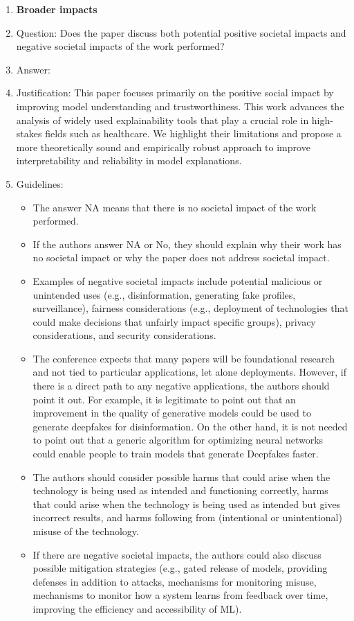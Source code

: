\documentclass{article}
\theoremstyle{plain}
\theoremstyle{definition}
\theoremstyle{remark}
\begin{document}
\begin{enumerate}
\item {\bf Broader impacts}
    \item[] Question: Does the paper discuss both potential positive societal impacts and negative societal impacts of the work performed?
    \item[] Answer: \answerYes{} %
    \item[] Justification: This paper focuses primarily on the positive social impact by improving model understanding and trustworthiness. This work advances the analysis of widely used explainability tools that play a crucial role in high-stakes fields such as healthcare. We highlight their limitations and propose a
more theoretically sound and empirically robust approach to improve interpretability and reliability in model explanations.
    \item[] Guidelines:
    \begin{itemize}
        \item The answer NA means that there is no societal impact of the work performed.
        \item If the authors answer NA or No, they should explain why their work has no societal impact or why the paper does not address societal impact.
        \item Examples of negative societal impacts include potential malicious or unintended uses (e.g., disinformation, generating fake profiles, surveillance), fairness considerations (e.g., deployment of technologies that could make decisions that unfairly impact specific groups), privacy considerations, and security considerations.
        \item The conference expects that many papers will be foundational research and not tied to particular applications, let alone deployments. However, if there is a direct path to any negative applications, the authors should point it out. For example, it is legitimate to point out that an improvement in the quality of generative models could be used to generate deepfakes for disinformation. On the other hand, it is not needed to point out that a generic algorithm for optimizing neural networks could enable people to train models that generate Deepfakes faster.
        \item The authors should consider possible harms that could arise when the technology is being used as intended and functioning correctly, harms that could arise when the technology is being used as intended but gives incorrect results, and harms following from (intentional or unintentional) misuse of the technology.
        \item If there are negative societal impacts, the authors could also discuss possible mitigation strategies (e.g., gated release of models, providing defenses in addition to attacks, mechanisms for monitoring misuse, mechanisms to monitor how a system learns from feedback over time, improving the efficiency and accessibility of ML).
    \end{itemize}
    

\end{enumerate}
\end{document}
